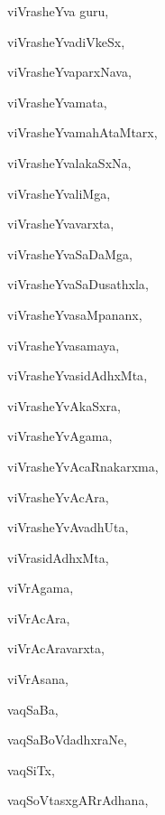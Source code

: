\begin{multicols}{3}
{\noindent
{viVrasheYva guru}, \pageref{viVrasheYvaguru}

\noindent
{viVrasheYvadiVkeSx}, \pageref{viVrasheYvadiVkeSx}

\noindent
{viVrasheYvaparxNava}, \pageref{viVrasheYvaparxNava}

\noindent
{viVrasheYvamata}, \pageref{viVrasheYvamata}

\noindent
{viVrasheYvamahAtaMtarx}, \pageref{viVrasheYvamahAtaMtarx}

\noindent
{viVrasheYvalakaSxNa}, \pageref{viVrasheYvalakaSxNa}

\noindent
{viVrasheYvaliMga}, \pageref{viVrasheYvaliMga}

\noindent
{viVrasheYvavarxta}, \pageref{viVrasheYvavarxta}

\noindent
{viVrasheYvaSaDaMga}, \pageref{viVrasheYvaSaDaMga}

\noindent
{viVrasheYvaSaDusathxla}, \pageref{viVrasheYvaSaDusathxla}

\noindent
{viVrasheYvasaMpananx}, \pageref{viVrasheYvasaMpananx}

\noindent
{viVrasheYvasamaya}, \pageref{viVrasheYvasamaya}

\noindent
{viVrasheYvasidAdhxMta}, \pageref{viVrasheYvasidAdhxMta}

\noindent
{viVrasheYvAkaSxra}, \pageref{viVrasheYvAkaSxra}

\noindent
{viVrasheYvAgama}, \pageref{viVrasheYvAgama}

\noindent
{viVrasheYvAcaRnakarxma}, \pageref{viVrasheYvAcaRnakarxma}

\noindent
{viVrasheYvAcAra}, \pageref{viVrasheYvAcAra}

\noindent
{viVrasheYvAvadhUta}, \pageref{viVrasheYvAvadhUta}

\noindent
{viVrasidAdhxMta}, \pageref{viVrasidAdhxMta}

\noindent
{viVrAgama}, \pageref{viVrAgama}

\noindent
{viVrAcAra}, \pageref{viVrAcAra}

\noindent
{viVrAcAravarxta}, \pageref{viVrAcAravarxta}

\noindent
{viVrAsana}, \pageref{viVrAsana}

\noindent
{vaqSaBa}, \pageref{vaqSaBa}

\noindent
{vaqSaBoVdadhxraNe}, \pageref{vaqSaBoVdadhxraNe}

\noindent
{vaqSiTx}, \pageref{vaqSiTx}

\noindent
{vaqSoVtasxgARrAdhana}, \pageref{vaqSoVtasxgARrAdhana}

}
\end{multicols}
